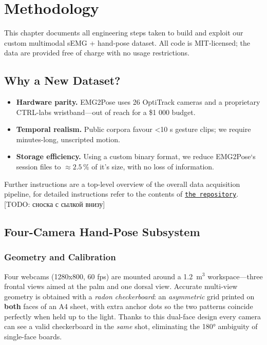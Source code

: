 \chapter{Methodology}
\label{chap:met}

This chapter documents all engineering steps taken to build and exploit our
custom multimodal sEMG + hand-pose dataset. All code is MIT-licensed; the data
are provided free of charge with no usage restrictions.

\section{Why a New Dataset?}

\begin{itemize}
  \item \textbf{Hardware parity.} EMG2Pose uses 26 OptiTrack cameras and a
        proprietary CTRL-labs wristband—out of reach for a \$1 000 budget.
  \item \textbf{Temporal realism.} Public corpora favour <10 s gesture clips;
        we require minutes-long, unscripted motion.
  \item \textbf{Storage efficiency.} Using a custom binary format, we
        reduce EMG2Pose`s session files to $\approx2.5\,\%$ of it's size, with no loss of
        information.
\end{itemize}

Further instructions are a top-level overview of the overall data acquisition pipeline, for detailed instructions refer to the contents of \href{https://github.com/Senopiece/webcam_hand_triangulation/tree/v1.0}{\texttt{the repository}}. [TODO: сноска с сылкой внизу]

\section{Four-Camera Hand-Pose Subsystem}

\subsection{Geometry and Calibration}

Four webcams (1280x800, 60 fps) are mounted around a
\SI{1.2}{\metre}$^{3}$ workspace—three frontal views aimed at the palm and one
dorsal view.  Accurate multi-view geometry is obtained with a \textit{radon
checkerboard}: an \emph{asymmetric} grid printed on \textbf{both} faces of an
A4 sheet, with extra anchor dots so the two patterns coincide perfectly when
held up to the light.  Thanks to this dual-face design every camera can see a
valid checkerboard in the \emph{same} shot, eliminating the 180° ambiguity of
single-face boards.

